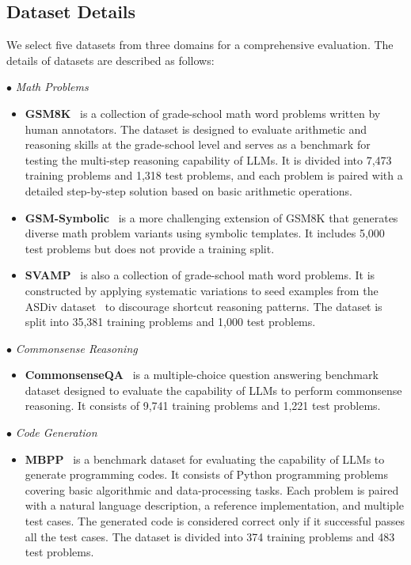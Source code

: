 \documentclass{article} %
\begin{document}
\subsection{Dataset Details}
\label{appendix:dataset_details}
We select five datasets from three domains for a comprehensive evaluation. The details of datasets are described as follows:

$\bullet$ {\it Math Problems}

\begin{itemize}[leftmargin=20px]
    \item {\bf GSM8K}~\citep{cobbe2021training} is a collection of grade-school math word problems written by human annotators. The dataset is designed to evaluate arithmetic and reasoning skills at the grade-school level and serves as a benchmark for testing the multi-step reasoning capability of LLMs. It is divided into 7,473 training problems and 1,318 test problems, and each problem is paired with a detailed step-by-step solution based on basic arithmetic operations.
    \item {\bf GSM-Symbolic}~\citep{mirzadeh2025gsmsymbolic} is a more challenging extension of GSM8K that generates diverse math problem variants using symbolic templates. It includes 5,000 test problems but does not provide a training split.
    \item {\bf SVAMP}~\citep{patel2021nlp} is also a collection of grade-school math word problems. It is constructed by applying systematic variations to seed examples from the ASDiv dataset~\citep{miao2020diverse} to discourage shortcut reasoning patterns. The dataset is split into 35,381 training problems and 1,000 test problems.
\end{itemize}


$\bullet$ {\it Commonsense Reasoning}

\begin{itemize}[leftmargin=20px]
    \item {\bf CommonsenseQA}~\citep{talmor2019commonsenseqa} is a multiple-choice question answering benchmark dataset designed to evaluate the capability of LLMs to perform commonsense reasoning. It consists of 9,741 training problems and 1,221 test problems.
\end{itemize}

$\bullet$ {\it Code Generation}

\begin{itemize}[leftmargin=20px]
    \item {\bf MBPP}~\citep{austin2021program} is a benchmark dataset for evaluating the capability of LLMs to generate programming codes. It consists of Python programming problems covering basic algorithmic and data-processing tasks. Each problem is paired with a natural language description, a reference implementation, and multiple test cases. The generated code is considered correct only if it successful passes all the test cases. The dataset is divided into 374 training problems and 483 test problems.
\end{itemize}
\end{document}
